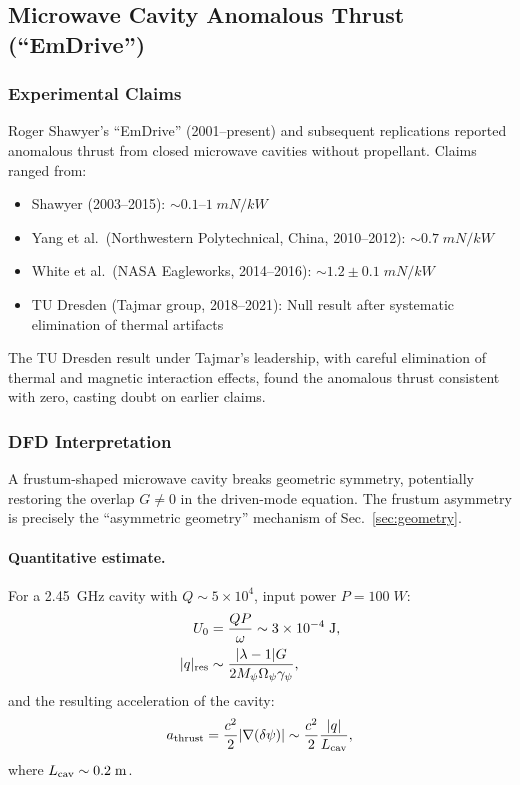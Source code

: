 \documentclass[aps,prd,twocolumn,superscriptaddress,floatfix,nofootinbib]{revtex4-2}
\newcommand{\Opsi}{\Omega_\psi}
\newcommand{\gpsi}{\gamma_\psi}
\newcommand{\Mpsi}{M_\psi}
\newcommand{\lam}{\lambda}
\begin{document}
\subsection{Microwave Cavity Anomalous Thrust (``EmDrive'')}\label{sec:emdrive}

\subsubsection{Experimental Claims}

Roger Shawyer's ``EmDrive'' (2001--present) and subsequent replications
reported anomalous thrust from closed microwave cavities without
propellant. Claims ranged from:
\begin{itemize}[nosep]
\item Shawyer (2003--2015): $\sim 0.1$--$1\;\si{mN/kW}$
\item Yang et al.\ (Northwestern Polytechnical, China, 2010--2012):
$\sim 0.7\;\si{mN/kW}$
\item White et al.\ (NASA Eagleworks, 2014--2016):
$\sim 1.2 \pm 0.1\;\si{mN/kW}$
\item TU Dresden (Tajmar group, 2018--2021): Null result after
systematic elimination of thermal artifacts
\end{itemize}

The TU Dresden result under Tajmar's leadership, with careful elimination
of thermal and magnetic interaction effects, found the anomalous thrust
consistent with zero, casting doubt on earlier claims.

\subsubsection{DFD Interpretation}

A frustum-shaped microwave cavity breaks geometric symmetry, potentially
restoring the overlap $G \neq 0$ in the driven-mode equation. The
frustum asymmetry is precisely the ``asymmetric geometry'' mechanism of
Sec.~\ref{sec:geometry}.

\paragraph{Quantitative estimate.}
For a 2.45~GHz cavity with $Q \sim 5 \times 10^4$, input power
$P = 100\;\si{W}$:
\begin{align}
U_0 &= \frac{QP}{\omega} \sim 3 \times 10^{-4}\;\si{J},\\
|q|_{\rm res} &\sim \frac{|\lam-1|G}{2\Mpsi\Opsi\gpsi},
\end{align}
and the resulting acceleration of the cavity:
\begin{equation}
a_{\rm thrust} = \frac{c^2}{2}|\nabla(\delta\psi)|
\sim \frac{c^2}{2}\frac{|q|}{L_{\rm cav}},
\end{equation}
where $L_{\rm cav} \sim 0.2\;\si{m}$.
\end{document}
